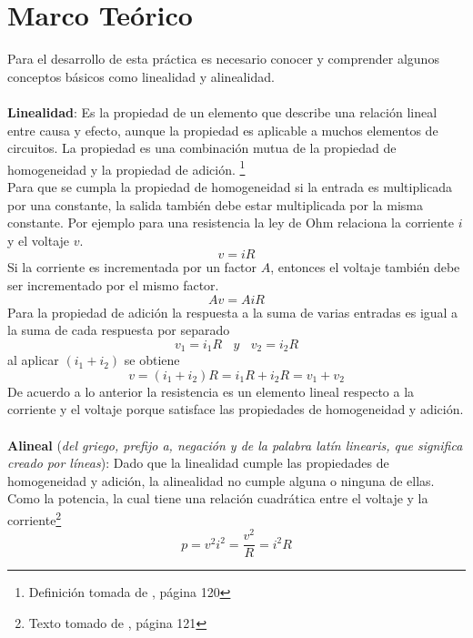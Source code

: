 \documentclass[twocolumn]{IEEEtran}
\begin{document}
\section{Marco Teórico}
\noindent
Para el desarrollo de esta práctica es necesario conocer y comprender algunos conceptos básicos como linealidad y alinealidad.\\\\
\textbf{Linealidad}: Es la propiedad de un elemento que describe una relación lineal entre causa y efecto, aunque la propiedad es aplicable a muchos elementos de circuitos. La propiedad es una combinación mutua de la propiedad de homogeneidad y la propiedad de adición. \footnote{Definición tomada de \cite{sadiku}, página 120}\\
Para que se cumpla la propiedad de homogeneidad si la entrada es multiplicada por una constante, la salida también debe estar multiplicada por la misma constante. Por ejemplo para una resistencia la ley de Ohm relaciona la corriente $i$ y el voltaje $v$.
\begin{equation}
 v=iR
\label{equ1}
\end{equation}
\noindent
Si la corriente es incrementada por un factor $A$, entonces el voltaje también debe ser incrementado por el mismo factor.
\begin{equation}
 Av=AiR
\label{equ2}
\end{equation}
\noindent
Para la propiedad de adición la respuesta a la suma de varias entradas es igual a la suma de cada respuesta por separado
\begin{equation}
 v_1 = i_1R \ \ \ \ y \ \ \ \ v_2 = i_2R
\end{equation}
\noindent
al aplicar $( i_1 + i_2 )$ se obtiene
\begin{equation}
 v = ( i_1 + i_2 ) R = i_1 R + i_2 R = v_1 + v_2
\end{equation}
\noindent
De acuerdo a lo anterior la resistencia es un elemento lineal respecto a la corriente y el voltaje porque satisface las propiedades de homogeneidad y adición.\\\\
\textbf{Alineal} (\textit{del griego, prefijo a, negación y de la palabra latín linearis, que significa creado por líneas}): Dado que la linealidad cumple las propiedades de homogeneidad y adición, la alinealidad no cumple alguna o ninguna de ellas. Como la potencia, la cual tiene una relación cuadrática entre el voltaje y la corriente\footnote{Texto tomado de \cite{sadiku}, página 121}
\begin{equation}
 p = v^{2} i^{2} = \frac{v^{2}}{R} = i^{2} R
\label{equ3}
\end{equation}
\end{document}
